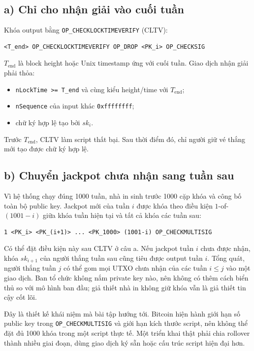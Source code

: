 \documentclass[12pt,a4paper]{article}
\begin{document}
\subsection*{a) Chỉ cho nhận giải vào cuối tuần}

Khóa output bằng \texttt{OP\_CHECKLOCKTIMEVERIFY} (CLTV):
\begin{lstlisting}[style=bitcoin]
<T_end> OP_CHECKLOCKTIMEVERIFY OP_DROP <PK_i> OP_CHECKSIG
\end{lstlisting}

$T_{\mathrm{end}}$ là block height hoặc Unix timestamp ứng với cuối tuần. Giao
dịch nhận giải phải thỏa:
\begin{itemize}
  \item \texttt{nLockTime >= T\_end} và cùng kiểu height/time với
        $T_{\mathrm{end}}$;
  \item \texttt{nSequence} của input khác \texttt{0xffffffff};
  \item chữ ký hợp lệ tạo bởi $sk_i$.
\end{itemize}
Trước $T_{\mathrm{end}}$, CLTV làm script thất bại. Sau thời điểm đó, chỉ người
giữ vé thắng mới tạo được chữ ký hợp lệ.

\subsection*{b) Chuyển jackpot chưa nhận sang tuần sau}

Vì hệ thống chạy đúng 1000 tuần, nhà in sinh trước 1000 cặp khóa và công bố
toàn bộ public key. Jackpot mới của tuần $i$ được khóa theo điều kiện
$1$-of-$(1001-i)$ giữa khóa tuần hiện tại và tất cả khóa các tuần sau:
\begin{lstlisting}[style=bitcoin]
1 <PK_i> <PK_(i+1)> ... <PK_1000> (1001-i) OP_CHECKMULTISIG
\end{lstlisting}

Có thể đặt điều kiện này sau CLTV ở câu a. Nếu jackpot tuần $i$ chưa được
nhận, khóa $sk_{i+1}$ của người thắng tuần sau cũng tiêu được output tuần $i$.
Tổng quát, người thắng tuần $j$ có thể gom mọi UTXO chưa nhận của các tuần
$i\le j$ vào một giao dịch. Ban tổ chức không nắm private key nào, nên không có
thêm cách biển thủ so với mô hình ban đầu; giả thiết nhà in không giữ khóa vẫn
là giả thiết tin cậy cốt lõi.

Đây là thiết kế khái niệm mà bài tập hướng tới. Bitcoin hiện hành giới hạn số
public key trong \texttt{OP\_CHECKMULTISIG} và giới hạn kích thước script, nên
không thể đặt đủ 1000 khóa trong một script thực tế. Một triển khai thật phải
chia rollover thành nhiều giai đoạn, dùng giao dịch ký sẵn hoặc cấu trúc script
hiện đại hơn.
\end{document}
